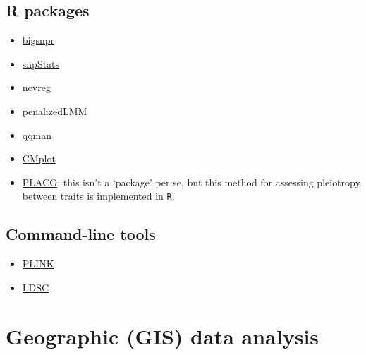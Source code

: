 \documentclass[
]{book}
\begin{document}
\hypertarget{r-packages}{%
\section{R packages}\label{r-packages}}

\begin{itemize}
\item
  \href{}{bigsnpr}
\item
  \href{}{snpStats}
\item
  \href{}{ncvreg}
\item
  \href{}{penalizedLMM}
\item
  \href{}{qqman}
\item
  \href{}{CMplot}
\item
  \href{}{PLACO}: this isn't a `package' per se, but this method for assessing pleiotropy between traits is implemented in \texttt{R}.
\end{itemize}

\hypertarget{command-line-tools}{%
\section{Command-line tools}\label{command-line-tools}}

\begin{itemize}
\item
  \href{}{PLINK}
\item
  \href{}{LDSC}
\end{itemize}

\hypertarget{geographic-gis-data-analysis}{%
\chapter{Geographic (GIS) data analysis}\label{geographic-gis-data-analysis}}

  
\end{document}
